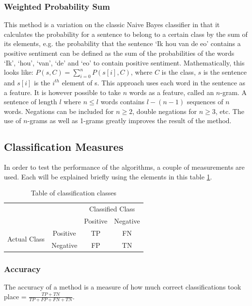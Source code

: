 \documentclass[11pt]{article}
\begin{document}
\subsubsection{Weighted Probability Sum}
This method is a variation on the classic Naive Bayes classifier in that it calculates the probability for a sentence to belong to a certain class by the sum of its elements, e.g. the probability that the sentence `Ik hou van de eo' contains a positive sentiment can be defined as the sum of the probabilities of the words `Ik', `hou', `van', `de' and `eo' to contain positive sentiment. Mathematically, this looks like:
$\displaystyle P(s, C) = \sum_{i=0}^n P( s[i], C )$, where $C$ is the class, $s $ is the sentence and $s[i]$ is the $i^{th}$ element of s.
This approach uses each word in the sentence as a feature. It is however possible to take $n$ words as a feature, called an $n$-gram. A sentence of length $l$ where $n \leq l$ words contains $l - (n-1)$ sequences of $n$ words. Negations can be included for $n \ge 2$, double negations for $n \ge 3$, etc. The use of $n$-grams as well as 1-grams greatly improves the result of the method.
\subsection{Classification Measures}
In order to test the performance of the algorithms, a couple of measurements are used. Each will be explained briefly using the elements in this table \ref{classification}.
\begin{table}[h]
\center
\begin{tabular}{cc|c|c|}
\cline{3-4}
& & \multicolumn{2}{|c|}{Classified Class} \\ \cline{3-4}
& & Positive & Negative \\ \cline{1-4}
\multicolumn{1}{|c|}{\multirow{2}{*}{Actual Class}} &
\multicolumn{1}{|c|}{Positive} & TP & FN \\ \cline{2-4}
\multicolumn{1}{|c|}{} &
\multicolumn{1}{|c|}{Negative} & FP & TN \\ \cline{1-4}
\end{tabular}
\caption{Table of classification classes}
\label{classification}
\end{table}
\subsubsection{Accuracy}
The accuracy of a method is a measure of how much correct classifications took place = $\frac{TP+TN}{TP+FP+FN+TN}$.
\end{document}
